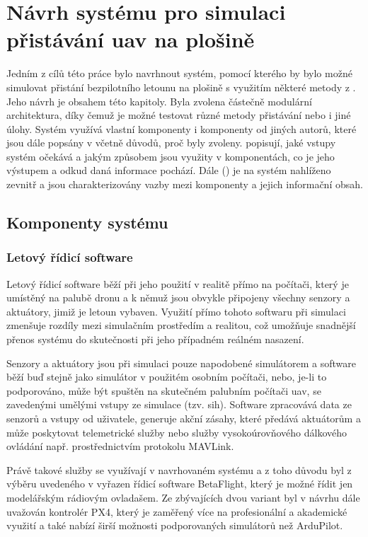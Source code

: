 \chapter{Návrh systému pro simulaci přistávání \acrshort{uav} na plošině}
  Jedním z cílů této práce bylo navrhnout systém, pomocí kterého by bylo možné simulovat přistání bezpilotního letounu na plošině s využitím některé metody z . Jeho návrh je obsahem této kapitoly. Byla zvolena částečně modulární architektura, díky čemuž je možné testovat různé metody přistávání nebo i jiné úlohy. Systém využívá vlastní komponenty i komponenty od jiných autorů, které jsou dále popsány v  včetně důvodů, proč byly zvoleny.  popisují, jaké vstupy systém očekává a jakým způsobem jsou využity v komponentách, co je jeho výstupem a odkud daná informace pochází. Dále () je na systém nahlíženo zevnitř a jsou charakterizovány vazby mezi komponenty a jejich informační obsah.
  
  \section{Komponenty systému} \label{sec:components}
    \subsection{Letový řídicí software}
      Letový řídicí software běží při jeho použití v realitě přímo na počítači, který je umístěný na palubě dronu a k němuž jsou obvykle připojeny všechny senzory a aktuátory, jimiž je letoun vybaven. Využití přímo tohoto softwaru při simulaci zmenšuje rozdíly mezi simulačním prostředím a realitou, což umožňuje snadnější přenos systému do skutečnosti při jeho případném reálném nasazení.
      
      Senzory a aktuátory jsou při simulaci pouze napodobené simulátorem a software běží buď stejně jako simulátor v použitém osobním počítači, nebo, je-li to podporováno, může být spuštěn na skutečném palubním počítači \acrshort{uav}, se zavedenými umělými vstupy ze simulace (tzv. \acrfull{sih}). Software zpracovává data ze senzorů a vstupy od uživatele, generuje akční zásahy, které předává aktuátorům a může poskytovat telemetrické služby nebo služby vysokoúrovňového dálkového ovládání např. prostřednictvím protokolu MAVLink.
      
      Právě takové služby se využívají v navrhovaném systému a z toho důvodu byl z výběru uvedeného v  vyřazen řídicí software BetaFlight, který je možné řídit jen modelářským rádiovým ovladašem. Ze zbývajících dvou variant byl v návrhu dále uvažován kontrolér PX4, který je zaměřený více na profesionální a akademické využití a také nabízí širší možnosti podporovaných simulátorů než ArduPilot.
